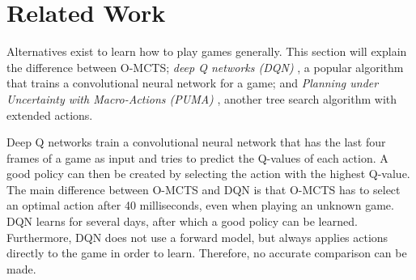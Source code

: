 \section{Related Work}
\label{sec:related}
Alternatives exist to learn how to play games generally. This section will
explain the difference between O-MCTS; \emph{deep Q networks (DQN)}
\cite{mnih2013playing}, a popular algorithm that trains a convolutional neural
network for a game; and \emph{Planning under Uncertainty with Macro-Actions
(PUMA)} \cite{he2010puma}, another tree search algorithm with extended actions.

Deep Q networks train a convolutional neural network that has the
last four frames of a game as input and tries to predict the Q-values of each
action. A good policy can then be created by selecting the action with the
highest Q-value. The main difference between O-MCTS and DQN is that O-MCTS has
to select an optimal action after 40 milliseconds, even when playing an unknown
game. DQN learns for several days, after which a good policy can be learned.
Furthermore, DQN does not use a forward model, but always applies actions
directly to the game in order to learn. 
Therefore, no accurate comparison can be made.



